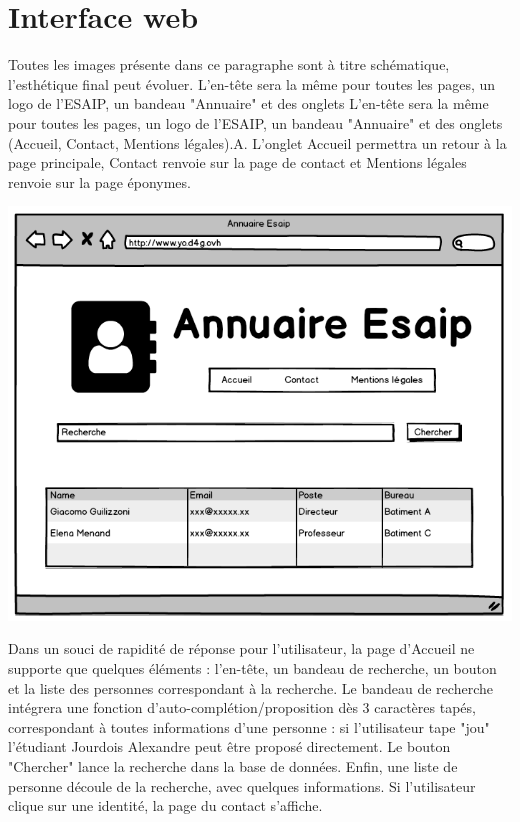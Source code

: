 \documentclass[11pt,a4paper]{report}
\begin{document}
		\section{Interface web}
		Toutes les images présente dans ce paragraphe sont à titre schématique, l'esthétique final peut évoluer. L'en-tête sera la même pour toutes les pages, un logo de l'ESAIP, un bandeau "Annuaire" et des onglets L'en-tête sera la même pour toutes les pages, un logo de l'ESAIP, un bandeau "Annuaire" et des onglets (Accueil, Contact, Mentions légales).A.
L'onglet Accueil permettra un retour à la page principale, Contact renvoie sur la page de contact et Mentions légales renvoie sur la page éponymes.
			\begin{center}
					\includegraphics[scale=0.4]{site}
			\end{center}
			Dans un souci de rapidité de réponse pour l'utilisateur, la page d'Accueil ne supporte que quelques éléments : l'en-tête, un bandeau de recherche, un bouton et la liste des personnes correspondant à la recherche.
Le bandeau de recherche intégrera une fonction d'auto-complétion/proposition dès 3 caractères tapés, correspondant à toutes informations d'une personne : si l'utilisateur tape "jou" l'étudiant Jourdois Alexandre peut être proposé directement.
Le bouton "Chercher" lance la recherche dans la base de données. Enfin, une liste de personne découle de la recherche, avec quelques informations. Si l'utilisateur clique sur une identité, la page du contact s'affiche.
\end{document}
